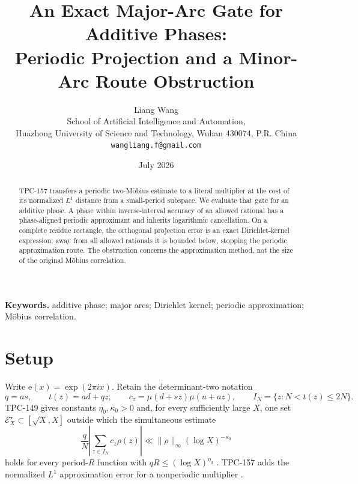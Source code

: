 \documentclass[11pt]{article}
\title{\textbf{An Exact Major-Arc Gate for Additive Phases:\\
Periodic Projection and a Minor-Arc Route Obstruction}}
\author{Liang Wang\\
\small School of Artificial Intelligence and Automation,\\[-2pt]
\small Huazhong University of Science and Technology, Wuhan 430074, P.R. China\\
\small \texttt{wangliang.f@gmail.com}}
\date{July 2026}
\theoremstyle{definition}
\newcommand{\e}{\mathrm e}
\newcommand{\norm}[1]{\lVert#1\rVert}
\begin{document}
\maketitle

\begin{abstract}
TPC-157 transfers a periodic two-M\"obius estimate to a literal
multiplier at the cost of its normalized \(L^1\) distance from a
small-period subspace.  We evaluate that gate for an additive phase.
A phase within inverse-interval accuracy of an allowed rational has
a phase-aligned periodic approximant and inherits logarithmic
cancellation.  On a complete residue rectangle, the orthogonal
projection error is an exact Dirichlet-kernel expression; away from
all allowed rationals it is bounded below, stopping the periodic
approximation route.  The obstruction concerns the approximation
method, not the size of the original M\"obius correlation.
\end{abstract}

\noindent\textbf{Keywords.}
additive phase; major arcs; Dirichlet kernel; periodic approximation;
M\"obius correlation.

\medskip
\noindent{}

\section{Setup}

Write \(\e(x)=\exp(2\pi i x)\).  Retain the determinant-two notation
\[
 q=as,\qquad t(z)=ad+qz,\qquad
 c_z=\mu(d+sz)\mu(u+az),\qquad
 I_N=\{z:N<t(z)\le2N\}.
\]
TPC-149 gives constants \(\eta_0,\kappa_0>0\) and, for every
sufficiently large \(X\), one set
\(\mathcal E_X^\star\subset[\sqrt X,X]\) outside which the
simultaneous estimate
\begin{equation}
 \frac qN\left|\sum_{z\in I_N}c_z\rho(z)\right|
 \ll\norm{\rho}_\infty(\log X)^{-\kappa_0}
\label{eq:periodic}
\end{equation}
holds for every period-\(R\) function with
\(qR\le(\log X)^{\eta_0}\) \citep{WangTPC149}.
TPC-157 adds the normalized \(L^1\) approximation error for a
nonperiodic multiplier \citep{WangTPC157}.
\end{document}
